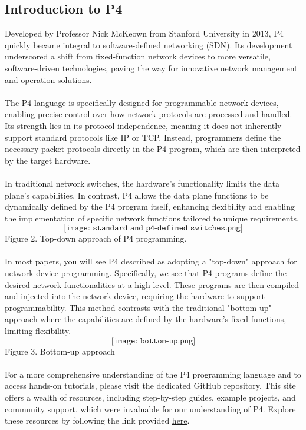 \subsection{Introduction to P4}
Developed by Professor Nick McKeown from Stanford University in 2013, P4 quickly became integral to software-defined networking (SDN). Its development underscored a shift from fixed-function network devices to more versatile, software-driven technologies, paving the way for innovative network management and operation solutions.\\
\\
The P4 language is specifically designed for programmable network devices, enabling precise control over how network protocols are processed and handled. Its strength lies in its protocol independence, meaning it does not inherently support standard protocols like IP or TCP. Instead, programmers define the necessary packet protocols directly in the P4 program, which are then interpreted by the target hardware.\\
\\
In traditional network switches, the hardware's functionality limits the data plane's capabilities. In contrast, P4 allows the data plane functions to be dynamically defined by the P4 program itself, enhancing flexibility and enabling the implementation of specific network functions tailored to unique requirements.\\
$$
\texttt{[image: standard\_and\_p4-defined\_switches.png]}
$$
Figure 2. Top-down approach of P4 programming.\\
\\
In most papers, you will see P4 described as adopting a "top-down" approach for network device programming. Specifically, we see that P4 programs define the desired network functionalities at a high level. These programs are then compiled and injected into the network device, requiring the hardware to support programmability. This method contrasts with the traditional "bottom-up" approach where the capabilities are defined by the hardware's fixed functions, limiting flexibility.
$$
\texttt{[image: bottom-up.png]}
$$
Figure 3. Bottom-up approach \\
\\
For a more comprehensive understanding of the P4 programming language and to access hands-on tutorials, please visit the dedicated GitHub repository. This site offers a wealth of resources, including step-by-step guides, example projects, and community support, which were invaluable for our understanding of P4. Explore these resources by following the link provided \href{https://github.com/p4lang/tutorials}{here}.
